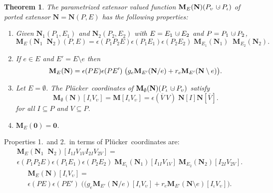 \documentclass[12pt]{article}
\newtheorem{theorem}{Theorem}[section]
\theoremstyle{definition}
\newcommand{\dunion}
{\mbox{\hbox{\hskip6pt$\cdot$\hskip-5.50pt$\cup$\hskip2pt}}}
\newcommand{\scomp}[1]{\ensuremath{\overline{#1}}}
\newcommand{\scma}{\ensuremath{\ }}
\newcommand{\Is}{\ensuremath{\iota}}
\newcommand{\Vs}{\ensuremath{\upsilon}}
\newcommand{\ext}[1]{\ensuremath{\mathbf{#1}}}
\newcommand{\extvee}{\;\;}
\newcommand{\Plucker}{Pl\"{u}cker\ }
\begin{document}
\begin{theorem}
\label{TheoremMain}
The parametrized extensor valued function 
$\ext{M}_E(\ext{N})(P_\Vs\dunion P_\Is)$ of ported extensor
$\ext{N}=\ext{N}(P,E)$
has the following properties:
\begin{enumerate}
\item
Given $\ext{N}_1(P_1,E_1)$ 
and $\ext{N}_2(P_2,E_2)$ with $E=E_1\dunion E_2$ and 
$P=P_1\dunion P_2$,
\begin{equation}
   \ext{M}_E(\ext{N}_1\extvee\ext{N}_2)(P,E) =
   \epsilon(P_1P_2E)\epsilon(P_1E_1)\epsilon(P_2E_2)\;
   \ext{M}_{E_1}(\ext{N}_1)\extvee
   \ext{M}_{E_2}(\ext{N}_2).
\end{equation}

\item
If $e\in E$ and $E'=E\setminus e$ then
\begin{equation}
   \ext{M}_E(\ext{N}) = \\
   \epsilon(PE)\epsilon(PE')\;
   \big(
   g_e\ext{M}_{E'}(\ext{N}/ e)
   +
   r_e\ext{M}_{E'}(\ext{N}\setminus e)\big).
\end{equation}
\item
Let $E=\emptyset$.  The \Plucker coordinates of 
$\ext{M}_\emptyset(\ext{N})(P_\Is\dunion P_\Vs)$ satisfy
\[
   \ext{M}_\emptyset(\ext{N})[I_{\Is}V_{\Vs}]=\ext{M}[I_{\Is}V_{\Vs}]=
    \epsilon(\scomp{V}\scma V)\;\ext{N}[I]\ext{N}[\scomp{V}].
\]
for all $I\subseteq P$ and $V\subseteq P$.

\item $\ext{M}_E(\ext{0}) = \ext{0}$.

\end{enumerate}
\end{theorem}

Properties 1.\  and 2.\  in terms of \Plucker coordinates are:
\begin{eqnarray}
\label{Thm10Pt1LHS}
\nonumber   \ext{M}_E(\ext{N}_1\extvee\ext{N}_2)[I_{1I}V_{1V}I_{2I}V_{2V}] =\\ 
   \epsilon(P_1P_2E)\epsilon(P_1E_1)\epsilon(P_2E_2)\;
   \ext{M}_{E_1}(\ext{N}_1)[I_{1I}V_{1V}]\;
     \ext{M}_{E_2}(\ext{N}_2)[I_{2I}V_{2V}].
\end{eqnarray}
\begin{eqnarray}
\nonumber   \ext{M}_E(\ext{N})[I_\Is V_\Vs]  = \\
   \epsilon(PE)\epsilon(PE')\;
   \big(
   (g_e\ext{M}_{E'}(\ext{N}/ e)[I_\Is V_\Vs]
   +
   r_e\ext{M}_{E'}(\ext{N}\setminus e)[I_\Is V_\Vs]\big).
\end{eqnarray}
\end{document}

